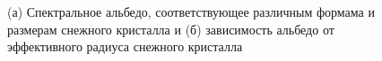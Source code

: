 \documentclass[a4paper, fontsize=14pt]{scrartcl}
\begin{document}
\begin{figure}[h]
    \begin{minipage}[h]{0.5\linewidth}
    \end{minipage}
    \hfill
    \begin{minipage}[h]{0.5\linewidth}
    \end{minipage}
    \caption{(а) Спектральное альбедо, соответствующее различным формама и размерам снежного кристалла и (б) зависимость альбедо от эффективного радиуса снежного кристалла}
    \label{fig:image}
\end{figure}
\end{document}
